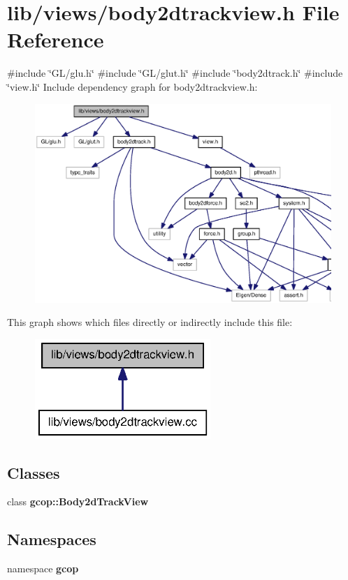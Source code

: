 \section{lib/views/body2dtrackview.h \-File \-Reference}
\label{body2dtrackview_8h}
{\ttfamily \#include \char`\"{}\-G\-L/glu.\-h\char`\"{}}\*
{\ttfamily \#include \char`\"{}\-G\-L/glut.\-h\char`\"{}}\*
{\ttfamily \#include \char`\"{}body2dtrack.\-h\char`\"{}}\*
{\ttfamily \#include \char`\"{}view.\-h\char`\"{}}\*
\-Include dependency graph for body2dtrackview.\-h\-:
\nopagebreak
\begin{figure}[H]
\begin{center}
\leavevmode
\includegraphics[width=350pt]{body2dtrackview_8h__incl}
\end{center}
\end{figure}
\-This graph shows which files directly or indirectly include this file\-:
\nopagebreak
\begin{figure}[H]
\begin{center}
\leavevmode
\includegraphics[width=188pt]{body2dtrackview_8h__dep__incl}
\end{center}
\end{figure}
\subsection*{\-Classes}
\begin{DoxyCompactItemize}
\item 
class {\bf gcop\-::\-Body2d\-Track\-View}
\end{DoxyCompactItemize}
\subsection*{\-Namespaces}
\begin{DoxyCompactItemize}
\item 
namespace {\bf gcop}
\end{DoxyCompactItemize}
